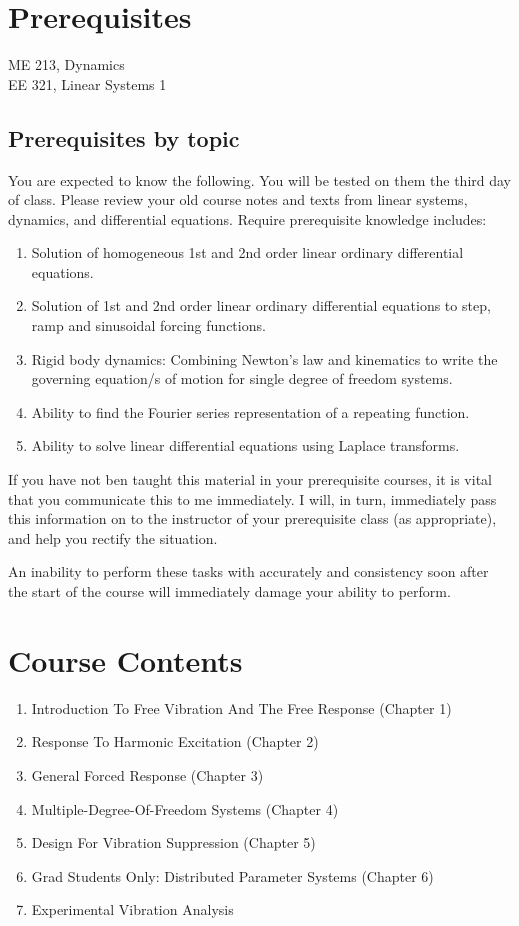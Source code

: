 \documentclass[10pt]{article}
\begin{document}
\section{Prerequisites}
ME 213, Dynamics\\
EE 321, Linear Systems 1
 
\subsection{Prerequisites by topic}
\label{sec:prerequisites-topic}
You are expected to know the following.  You will be tested on them the third day of class.  Please review your old course notes and texts from linear systems, dynamics, and differential equations. Require prerequisite knowledge includes:
\begin{enumerate}
        \item Solution of homogeneous 1st and 2nd order linear ordinary differential
        equations.
        \item Solution of  1st and 2nd order linear ordinary differential
        equations to step, ramp and sinusoidal forcing functions.
        \item Rigid body dynamics: Combining Newton's law and kinematics to 
        write the governing equation/s of motion for single degree of 
        freedom systems. 
        \item Ability to find the Fourier series representation of a 
        repeating function.
        \item Ability to solve linear differential equations using Laplace 
        transforms.
\end{enumerate}
If you have not ben taught this material in your prerequisite courses, it is vital that you communicate this to me immediately. I will, in turn, immediately pass this information on to the instructor of your prerequisite class (as appropriate), and help you rectify the situation. 

An inability to perform these tasks with accurately and consistency soon after the start of the course will immediately damage your ability to perform.
\section{Course Contents}
\begin{enumerate}
        \item Introduction To Free Vibration And The Free Response (Chapter 1)
        \item Response To Harmonic Excitation (Chapter 2)
        \item General Forced Response (Chapter 3)
        \item Multiple-Degree-Of-Freedom Systems (Chapter 4)
        \item Design For Vibration Suppression (Chapter 5)
        \item Grad Students Only: Distributed Parameter Systems (Chapter 6)
        \item Experimental Vibration Analysis
\end{enumerate}
\end{document}
